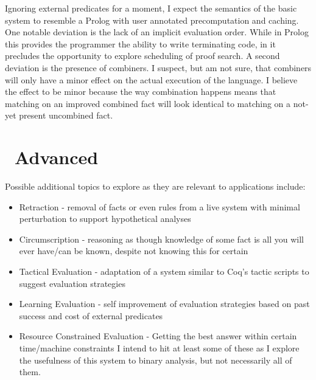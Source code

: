 Ignoring external predicates for a moment, I expect the semantics of the basic system to resemble a Prolog with user annotated precomputation and caching.
One notable deviation is the lack of an implicit evaluation order.
While in Prolog this provides the programmer the ability to write terminating code, in \sysname it precludes the opportunity to explore scheduling of proof search.
A second deviation is the presence of combiners.
I suspect, but am not sure, that combiners will only have a minor effect on the actual execution of the language.
I believe the effect to be minor because the way combination happens means that matching on an improved combined fact will look identical to matching on a not-yet present uncombined fact.

\section{\sysname\ Advanced}
Possible additional topics to explore as they are relevant to applications include:
\begin{itemize}
\item Retraction - removal of facts or even rules from a live system with minimal perturbation to support hypothetical analyses
\item Circumscription - reasoning as though knowledge of some fact is all you will ever have/can be known, despite not knowing this for certain
\item Tactical Evaluation - adaptation of a system similar to Coq's tactic scripts to suggest evaluation strategies
\item Learning Evaluation - self improvement of evaluation strategies based on past success and cost of external predicates
\item Resource Constrained Evaluation - Getting the best answer within certain time/machine constraints
I intend to hit at least some of these as I explore the usefulness of this system to binary analysis, but not necessarily all of them.
\end{itemize}
